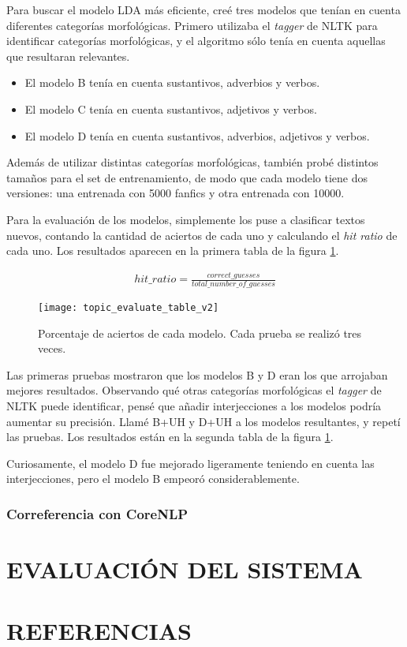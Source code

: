 \documentclass{pre-tfg}
\begin{document}
Para buscar el modelo LDA más eficiente, creé tres modelos que tenían en cuenta diferentes categorías morfológicas. Primero utilizaba el \textit{tagger} de NLTK para identificar categorías morfológicas, y el algoritmo sólo tenía en cuenta aquellas que resultaran relevantes.

\begin{itemize}
	\item El modelo B tenía en cuenta sustantivos, adverbios y verbos.
	\item El modelo C tenía en cuenta sustantivos, adjetivos y verbos.
	\item El modelo D tenía en cuenta sustantivos, adverbios, adjetivos y verbos.
\end{itemize}

Además de utilizar distintas categorías morfológicas, también probé distintos tamaños para el set de entrenamiento, de modo que cada modelo tiene dos versiones: una entrenada con 5000 fanfics y otra entrenada con 10000.

Para la evaluación de los modelos, simplemente los puse a clasificar textos nuevos, contando la cantidad de aciertos de cada uno y calculando el \textit{hit ratio} de cada uno. Los resultados aparecen en la primera tabla de la figura \ref{table:topic_evaluation}.

\begin{gather*}
hit\_ratio = \frac{correct\_guesses}{total\_number\_of\_guesses}
\end{gather*}

\begin{figure}
	\caption{Porcentaje de aciertos de cada modelo. Cada prueba se realizó tres veces.}
	\label{table:topic_evaluation}
	\texttt{[image: topic\_evaluate\_table\_v2]}
	\centering
\end{figure}

Las primeras pruebas mostraron que los modelos B y D eran los que arrojaban mejores resultados. Observando qué otras categorías morfológicas el \textit{tagger} de NLTK puede identificar, pensé que añadir interjecciones a los modelos podría aumentar su precisión. Llamé B+UH y D+UH a los modelos resultantes, y repetí las pruebas. Los resultados están en la segunda tabla de la figura \ref{table:topic_evaluation}.

Curiosamente, el modelo D fue mejorado ligeramente teniendo en cuenta las interjecciones, pero el modelo B empeoró considerablemente.


\subsubsection{Correferencia con CoreNLP}


\section{EVALUACIÓN DEL SISTEMA}


\section{REFERENCIAS}





\singlespacing
%

\end{document}
